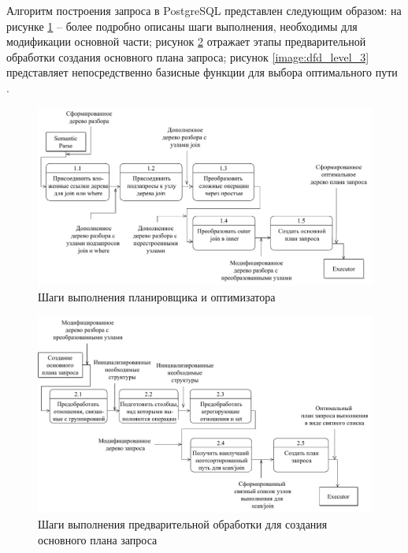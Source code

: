 Алгоритм построения запроса в PostgreSQL представлен следующим образом: на  рисунке \ref{image:dfd_level_1} -- более подробно описаны шаги выполнения, необходимы для модификации основной части; рисунок \ref{image:dfd_level_2} отражает этапы предварительной обработки создания основного плана запроса; рисунок \ref{image:dfd_level_3} представляет непосредственно базисные функции для выбора оптимального пути \cite{source_code_postgresql, help_understanding_code}.
\clearpage
\begin{figure}[ht!]
	\captionsetup{justification=centering}
	\includegraphics[scale=0.6]{images/dfd_level_1}
	\caption{Шаги выполнения планировщика и оптимизатора}
	\label{image:dfd_level_1}
\end{figure}	
\begin{figure}[ht!]
	\captionsetup{justification=centering}
	\includegraphics[scale=0.6]{images/dfd_level_2}
	\caption{Шаги выполнения предварительной обработки для создания основного плана запроса}
	\label{image:dfd_level_2}
\end{figure}
\clearpage

